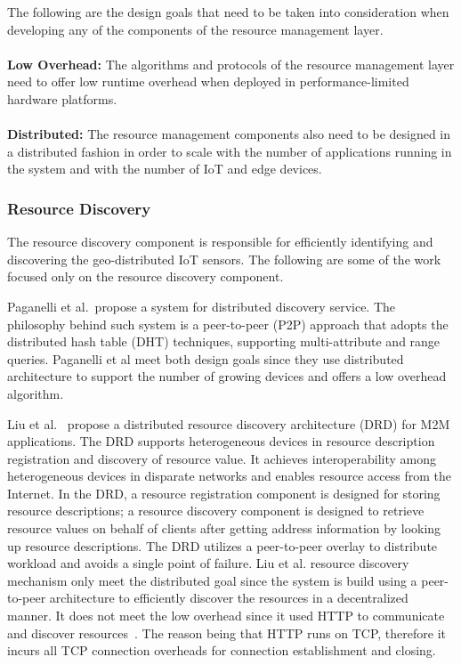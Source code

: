 The following are the design goals that need to be taken into consideration when developing any of the components of the resource management layer.
\\\\
\textbf{Low Overhead:} The algorithms and protocols of the resource management layer need to offer low runtime overhead when deployed in performance-limited hardware platforms.
\\\\
\textbf{Distributed:} The resource management components also need to be designed in a distributed fashion in order to scale with the number of applications running in the system and with the number of IoT and edge devices.




\subsubsection{Resource Discovery}
The resource discovery component is responsible for efficiently identifying and discovering the geo-distributed IoT sensors. 
The following are some of the work focused only on the resource discovery component. 

Paganelli et al.~\cite{article}propose a system for distributed discovery service. The philosophy behind such system is a peer-to-peer (P2P) approach that adopts the distributed hash table (DHT) techniques, supporting multi-attribute and range queries. Paganelli et al meet both design goals since they use distributed architecture to support the number of growing devices and offers a low overhead algorithm.

Liu et al.~\cite{6680268} propose a distributed resource discovery architecture (DRD) for M2M applications. The DRD supports
heterogeneous devices in resource description registration and discovery of resource value. It achieves interoperability among
heterogeneous devices in disparate networks and enables resource access from the Internet. In the DRD, a resource registration component is designed for storing resource descriptions; a resource discovery component is designed to retrieve resource values on behalf of clients after getting address information by looking up resource descriptions. The DRD utilizes a peer-to-peer overlay to distribute workload and avoids a single point of failure. Liu et al. resource discovery mechanism only meet the distributed goal since the system is build using a peer-to-peer architecture to efficiently discover the resources in a decentralized manner. It does not meet the low overhead since it used HTTP to communicate and discover resources~\cite{8088251}. The reason being that HTTP runs on TCP, therefore it incurs all TCP connection overheads for connection establishment and closing.

